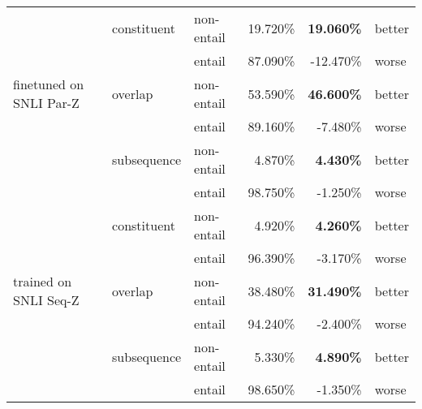 \documentclass{article}
\begin{document}
\begin{table}[]
\begin{tabular}{lllrrl}
                                          & constituent         & non-entail          & 19.720\%                               & \textbf{19.060\%}                               & better        \\
                                          &                     & entail              & 87.090\%                               & -12.470\%                                       & worse         \\
        finetuned on SNLI Par-Z          & overlap             & non-entail          & 53.590\%                               & \textbf{46.600\%}                               & better        \\
                                          &                     & entail              & 89.160\%                               & -7.480\%                                        & worse         \\
                                          & subsequence         & non-entail          & 4.870\%                                & \textbf{4.430\%}                                & better        \\
                                          &                     & entail              & 98.750\%                               & -1.250\%                                        & worse         \\
                                          & constituent         & non-entail          & 4.920\%                                & \textbf{4.260\%}                                & better        \\
                                          &                     & entail              & 96.390\%                               & -3.170\%                                        & worse         \\
        trained on SNLI Seq-Z            & overlap             & non-entail          & 38.480\%                               & \textbf{31.490\%}                               & better        \\
                                          &                     & entail              & 94.240\%                               & -2.400\%                                        & worse         \\
                                          & subsequence         & non-entail          & 5.330\%                                & \textbf{4.890\%}                                & better        \\
                                          &                     & entail              & 98.650\%                               & -1.350\%                                        & worse         \\

\end{tabular}
\end{table}
\end{document}
